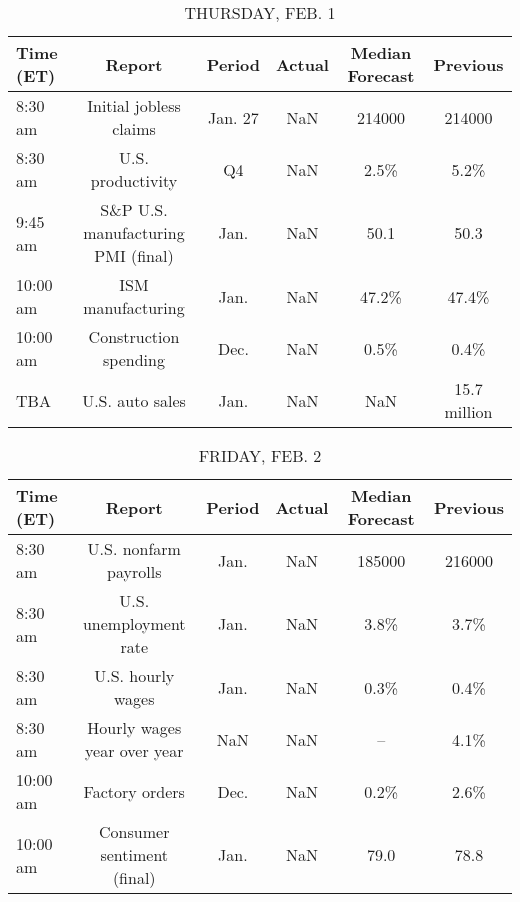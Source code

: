 \documentclass{article}%
\begin{document}
%


\begin{table}[htbp]%
\caption{THURSDAY, FEB. 1}%
\centering%
\begin{adjustbox}{width=1\textwidth}%
\begin{tabular}{lccccc}
\toprule
Time (ET) &                             Report &  Period & Actual & Median Forecast &     Previous \\
\midrule
  8:30 am &             Initial jobless claims & Jan. 27 &    NaN &          214000 &       214000 \\
  8:30 am &                  U.S. productivity &      Q4 &    NaN &            2.5\% &         5.2\% \\
  9:45 am & S\&P U.S. manufacturing PMI (final) &    Jan. &    NaN &            50.1 &         50.3 \\
 10:00 am &                  ISM manufacturing &    Jan. &    NaN &           47.2\% &        47.4\% \\
 10:00 am &              Construction spending &    Dec. &    NaN &            0.5\% &         0.4\% \\
      TBA &                    U.S. auto sales &    Jan. &    NaN &             NaN & 15.7 million \\
\bottomrule
\end{tabular}
%
\end{adjustbox}%
\end{table}

%


\begin{table}[htbp]%
\caption{FRIDAY, FEB. 2}%
\centering%
\begin{adjustbox}{width=1\textwidth}%
\begin{tabular}{lccccc}
\toprule
Time (ET) &                      Report & Period & Actual & Median Forecast & Previous \\
\midrule
  8:30 am &       U.S. nonfarm payrolls &   Jan. &    NaN &          185000 &   216000 \\
  8:30 am &      U.S. unemployment rate &   Jan. &    NaN &            3.8\% &     3.7\% \\
  8:30 am &           U.S. hourly wages &   Jan. &    NaN &            0.3\% &     0.4\% \\
  8:30 am & Hourly wages year over year &    NaN &    NaN &              -- &     4.1\% \\
 10:00 am &              Factory orders &   Dec. &    NaN &            0.2\% &     2.6\% \\
 10:00 am &  Consumer sentiment (final) &   Jan. &    NaN &            79.0 &     78.8 \\
\bottomrule
\end{tabular}
%
\end{adjustbox}%
\end{table}
\end{document}
